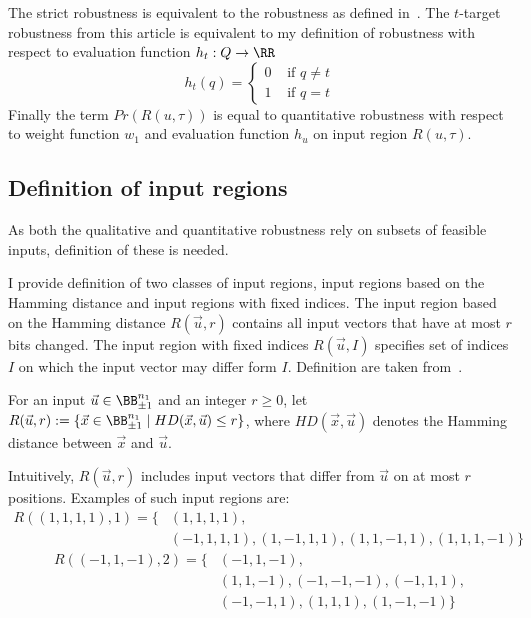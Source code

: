 The strict robustness is equivalent to the robustness as defined in~\cite{10.1145/3563212}.
The $t$-target robustness from this article is equivalent to my definition
of robustness with respect to evaluation function $h_t: Q\to \RR$%
\label{sec:t-target_robustness}
\begin{equation*}
    h_t(q) = \left\{\begin{matrix}
        0 & \text{ if } q \neq t\\
        1 & \text{ if } q = t
    \end{matrix}\right.
\end{equation*}
Finally the term $Pr(R(u, \tau))$ is equal to quantitative robustness  %
with respect to weight function $w_1$ and evaluation function $h_u$
on input region $R(u, \tau)$.


\subsection{Definition of input regions}

As both the qualitative and quantitative robustness rely on subsets
of feasible inputs, definition of these is needed.

I provide definition of two classes of input regions, input regions based
on the Hamming distance and input regions with fixed indices.
The input region based on the Hamming distance $R(\vec u, r)$ contains
all input vectors that have at most $r$ bits changed.
The input region with fixed indices $R(\vec u, I)$ specifies set of indices $I$
on which the input vector may differ form $I$.
Definition are taken from~\cite{zhang2021bdd4bnn}.

\begin{definition}
    For an input $\vec u\in \BB^{n_1}_{\pm 1}$ and an integer $r \geq 0$, let
    $R(\vec u, r) := \{\vec x\in \BB^{n_1}_{\pm 1} \mid HD(\vec x, \vec u) \leq r \}$,
    where $HD(\vec x, \vec u)$ denotes the Hamming distance
    between $\vec x$ and $\vec u$.
\end{definition}

Intuitively, $R(\vec u, r)$ includes input vectors that differ from $\vec u$ on at most
$r$ positions. Examples of such input regions are:
\begin{align*}
    R((1, 1, 1, 1), 1) = \{&(1, 1, 1, 1),\\
    &(-1, 1, 1, 1), (1, -1, 1, 1), (1, 1, -1, 1), (1, 1, 1, -1)\}
\end{align*}
\begin{align*}
    R((-1, 1, -1), 2) = \{&(-1, 1, -1),\\
    &(1, 1, -1), (-1, -1, -1), (-1, 1, 1),\\
    &(-1, -1, 1), (1, 1, 1), (1, -1, -1)\}
\end{align*}

